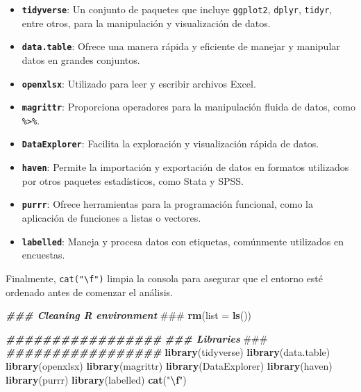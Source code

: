 \documentclass[
  12pt,
]{book}
\newenvironment{Shaded}{\begin{snugshade}}{\end{snugshade}}
\newcommand{\AlertTok}[1]{\textcolor[rgb]{0.94,0.16,0.16}{#1}}
\newcommand{\AttributeTok}[1]{\textcolor[rgb]{0.13,0.29,0.53}{#1}}
\newcommand{\DocumentationTok}[1]{\textcolor[rgb]{0.56,0.35,0.01}{\textbf{\textit{#1}}}}
\newcommand{\FunctionTok}[1]{\textcolor[rgb]{0.13,0.29,0.53}{\textbf{#1}}}
\newcommand{\NormalTok}[1]{#1}
\newcommand{\SpecialCharTok}[1]{\textcolor[rgb]{0.81,0.36,0.00}{\textbf{#1}}}
\newcommand{\StringTok}[1]{\textcolor[rgb]{0.31,0.60,0.02}{#1}}
\providecommand{\tightlist}{%
  \setlength{\itemsep}{0pt}\setlength{\parskip}{0pt}}
\begin{document}
\begin{itemize}
\tightlist
\item
  \textbf{\texttt{tidyverse}}: Un conjunto de paquetes que incluye \texttt{ggplot2}, \texttt{dplyr}, \texttt{tidyr}, entre otros, para la manipulación y visualización de datos.
\item
  \textbf{\texttt{data.table}}: Ofrece una manera rápida y eficiente de manejar y manipular datos en grandes conjuntos.
\item
  \textbf{\texttt{openxlsx}}: Utilizado para leer y escribir archivos Excel.
\item
  \textbf{\texttt{magrittr}}: Proporciona operadores para la manipulación fluida de datos, como \texttt{\%\textgreater{}\%}.
\item
  \textbf{\texttt{DataExplorer}}: Facilita la exploración y visualización rápida de datos.
\item
  \textbf{\texttt{haven}}: Permite la importación y exportación de datos en formatos utilizados por otros paquetes estadísticos, como Stata y SPSS.
\item
  \textbf{\texttt{purrr}}: Ofrece herramientas para la programación funcional, como la aplicación de funciones a listas o vectores.
\item
  \textbf{\texttt{labelled}}: Maneja y procesa datos con etiquetas, comúnmente utilizados en encuestas.
\end{itemize}

Finalmente, \texttt{cat("\textbackslash{}f")} limpia la consola para asegurar que el entorno esté ordenado antes de comenzar el análisis.

\begin{Shaded}
\begin{Highlighting}[]
\DocumentationTok{\#\#\# Cleaning R environment }\AlertTok{\#\#\#}
\FunctionTok{rm}\NormalTok{(}\AttributeTok{list =} \FunctionTok{ls}\NormalTok{())}

\DocumentationTok{\#\#\#\#\#\#\#\#\#\#\#\#\#\#\#\#\#}
\DocumentationTok{\#\#\# Libraries }\AlertTok{\#\#\#}
\DocumentationTok{\#\#\#\#\#\#\#\#\#\#\#\#\#\#\#\#\#}
\FunctionTok{library}\NormalTok{(tidyverse)}
\FunctionTok{library}\NormalTok{(data.table)}
\FunctionTok{library}\NormalTok{(openxlsx)}
\FunctionTok{library}\NormalTok{(magrittr)}
\FunctionTok{library}\NormalTok{(DataExplorer)}
\FunctionTok{library}\NormalTok{(haven)}
\FunctionTok{library}\NormalTok{(purrr)}
\FunctionTok{library}\NormalTok{(labelled)}
\FunctionTok{cat}\NormalTok{(}\StringTok{"}\SpecialCharTok{\textbackslash{}f}\StringTok{"}\NormalTok{)}
\end{Highlighting}
\end{Shaded}
\end{document}
